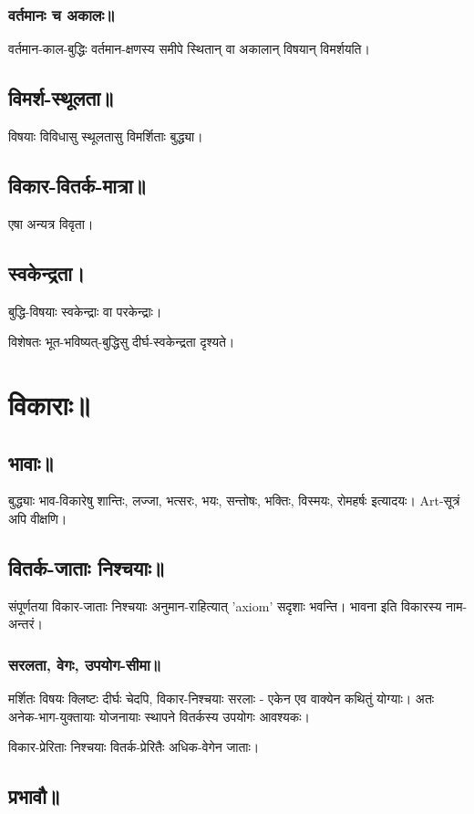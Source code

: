 \documentclass[oneside, article]{memoir}
\begin{document}
\subsubsection{वर्तमानः च अकालः॥}
वर्तमान-काल-बुद्धिः वर्तमान-क्षणस्य समीपे स्थितान् वा अकालान् विषयान् विमर्शयति।

\subsection{विमर्श-स्थूलता॥}
विषयाः विविधासु स्थूलतासु विमर्शिताः बुद्ध्या।

\subsection{विकार-वितर्क-मात्रा॥}
एषा अन्यत्र विवृता।

\subsection{स्वकेन्द्रता।}
बुद्धि-विषयाः स्वकेन्द्राः वा परकेन्द्राः।

विशेषतः भूत-भविष्यत्-बुद्धिसु दीर्घ-स्वकेन्द्रता दृश्यते।

\section{विकाराः॥}
\subsection{भावाः॥}
बुद्ध्याः भाव-विकारेषु शान्तिः, लज्जा, भत्सरः, भयः, सन्तोषः, भक्तिः, विस्मयः, रोमहर्षः इत्यादयः। Art-सूत्रं अपि वीक्षणि।

\subsection{वितर्क-जाताः निश्चयाः॥}
संपूर्णतया विकार-जाताः निश्चयाः अनुमान-राहित्यात् 'axiom' सदृशाः भवन्ति। भावना इति विकारस्य नाम-अन्तरं।

\subsubsection{सरलता, वेगः, उपयोग-सीमा॥}
मर्शितः विषयः क्लिष्टः दीर्घः चेदपि, विकार-निश्चयाः सरलाः - एकेन एव वाक्येन कथितुं योग्याः। अतः अनेक-भाग-युक्तायाः योजनायाः स्थापने वितर्कस्य उपयोगः आवश्यकः।

विकार-प्रेरिताः निश्चयाः वितर्क-प्रेरितैः अधिक-वेगेन जाताः।


\subsection{प्रभावौ॥}
\end{document}
